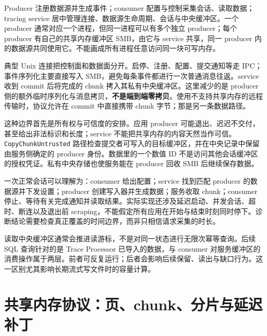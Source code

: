 \documentclass[UTF8,fontset=fandol,openany,11pt]{ctexbook}
\begin{document}
Producer 注册数据源并生成事件；consumer 配置与控制采集会话、读取数据；tracing service 居中管理连接、数据源生命周期、会话与中央缓冲区。一个 producer 通常对应一个进程，但同一进程可以有多个独立 producer；每个 producer 有自己的共享内存缓冲区 SMB，由它与 service 共享，同一 producer 内的数据源共同使用它。不能画成所有进程任意访问同一块可写内存。\cite{pf-service}


典型 Unix 连接把控制面和数据面分开。启停、注册、配置、提交通知等走 IPC；事件序列化主要直接写入 SMB，避免每条事件都进行一次普通消息往返。service 收到 commit 后将完成的 chunk 拷入其私有中央缓冲区。这里减少的是 producer 侧的额外临时序列化与消息拷贝，\textbf{不是端到端零拷贝}。使用不支持共享内存的远程传输时，协议允许在 commit 中直接携带 chunk 字节；那是另一条数据路径。\cite{pf-service}\cite{pf-commit}


这种边界首先是所有权与可信度的安排。应用 producer 可能退出、迟迟不交付，甚至给出非法标识和长度；service 不能把共享内存的内容天然当作可信。\texttt{CopyChunkUntrusted} 路径检查提交者可写入的目标缓冲区，并在中央记录中保留由服务侧确定的 producer 身份。数据里的一个数值 ID 不是访问其他会话缓冲区的授权凭证。私有中央存储也使服务能在 producer 回收 SMB 后继续保存数据。\cite{pf-service-impl}\cite{pf-buffer-v1}


一次正常会话可以理解为：consumer 给出配置；service 找到匹配 producer 的数据源并下发设置；producer 创建写入器并生成数据；服务收取 chunk；consumer 停止、等待有关完成通知并读取结果。实际实现还涉及延迟启动、并发会话、超时、断连以及退出前 scraping，不能假定所有应用在开始与结束时刻同时停下。诊断结论需要检查真正覆盖的时间边界，而非只相信请求采集的时长。\cite{pf-service}\cite{pf-service-impl}


读取中央缓冲区通常会推进读游标，不是对同一状态进行无限次幂等查询。后续 SQL 查询针对的是 Trace Processor 已导入的数据，与 consumer 对服务缓冲区的消费操作属于两层。前者可反复运行；后者会影响后续保留、读出与缺口行为。这一区别尤其影响长期流式写文件时的容量计算。\cite{pf-buffer-v1}


\section{共享内存协议：页、chunk、分片与延迟补丁}
\end{document}
